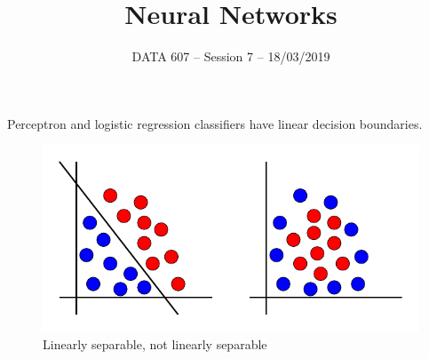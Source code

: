 \documentclass{beamer}
\begin{document}
    
\setlength{\parskip}{1em}
\begin{frame}
    \title{Neural Networks}
    \date{DATA 607 -- Session 7 -- 18/03/2019}
    \maketitle
\end{frame}

\begin{frame}{}
    Perceptron and logistic regression classifiers have linear decision boundaries.
    \begin{figure}
    \includegraphics[]{linear/linear.pdf}
    \caption{Linearly separable, not linearly separable}
    \end{figure}
\end{frame}
\end{document}
